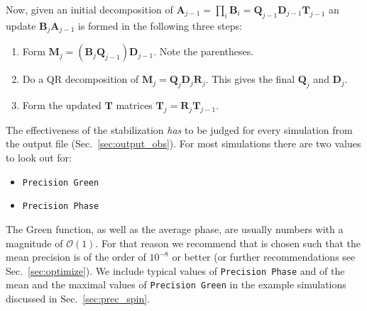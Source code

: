 Now, given an initial decomposition of $\bm{A}_{j-1} = \prod_i \mathcal{\bm{B}}_i = \bm{Q}_{j-1} \bm{D}_{j-1} \bm{T}_{j-1}$ an update
$\mathcal{\bm{B}}_j \bm{A}_{j-1}$ is formed in the following three steps:
\begin{enumerate}
\item Form $ \bm{M}_j = (\mathcal{\bm{B}}_j \bm{Q}_{j-1}) \bm{D}_{j-1}$. Note the parentheses.
\item Do a QR decomposition of $\bm{M}_j = \bm{Q}_j \bm{D}_j \bm{R}_j$. This gives the final $\bm{Q}_j$ and $\bm{D}_j$.
\item Form the updated $\bm{T}$ matrices $\bm{T}_j = \bm{R}_j \bm{T}_{j-1}$.
\end{enumerate}
The effectiveness of the stabilization \emph{has} to be judged for every simulation from the output file  (Sec.~\ref{sec:output_obs}). For most simulations there are two values to look out for:
\begin{itemize}
\item \texttt{Precision Green} 
\item \texttt{Precision Phase} 
\end{itemize}
The Green function, as well as the average phase, are usually numbers with a magnitude of $\mathcal{O} (1)$. 
For that reason we recommend that   is chosen such that the mean precision is of the order of $10^{-8}$ or better (or further recommendations see Sec.~\ref{sec:optimize}).
We include typical values of \texttt{Precision Phase} and of the mean and the maximal values of \texttt{Precision Green} in the example simulations discussed in Sec.~\ref{sec:prec_spin}.
